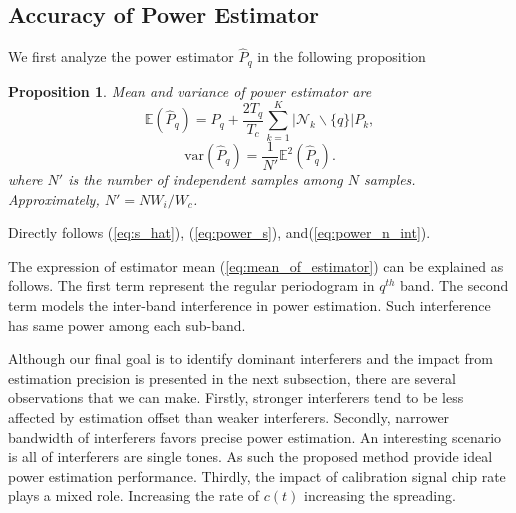 \documentclass{IEEEtran}
\newtheorem{proposition}{Proposition}
\begin{document}

%
%
\subsection{Accuracy of Power Estimator}
\label{sec:problem_formulation}
We first analyze the power estimator $\hat{P}_{q}$ in the following proposition

\begin{proposition}
\label{proposition:estimation_formulation}
Mean and variance of power estimator are
\begin{equation}
\mathbb{E}\left(\hat{P}_{q}\right) = P_{q}+\frac{2T_q}{T_c}\sum\limits_{k=1}^{K}\left|\mathcal{N}_k\backslash \{q\}\right|P_{k},
\label{eq:mean_of_estimator}
\end{equation}
\begin{equation}
\text{var}\left(\hat{P}_{q}\right) = \frac{1}{N'}\mathbb{E}^2\left(\hat{P}_{q}\right).
\label{eq:var_of_estimator}
\end{equation}
where $N'$ is the number of independent samples among $N$ samples. Approximately, $N' = NW_i/W_c$.
\end{proposition}
\begin{IEEEproof}
Directly follows (\ref{eq:s_hat}), (\ref{eq:power_s}), and(\ref{eq:power_n_int}).
\end{IEEEproof}

The expression of estimator mean (\ref{eq:mean_of_estimator}) can be explained as follows. The first term represent the regular periodogram in $q^{th}$ band. The second term models the inter-band interference in power estimation. Such interference has same power among each sub-band.

Although our final goal is to identify dominant interferers and the impact from estimation precision is presented in the next subsection, there are several observations that we can make. Firstly, stronger interferers tend to be less affected by estimation offset than weaker interferers. Secondly, narrower bandwidth of interferers favors precise power estimation. An interesting scenario is all of interferers are single tones. As such the proposed method provide ideal power estimation performance. Thirdly, the impact of calibration signal chip rate plays a mixed role. Increasing the rate of $c(t)$ increasing the spreading. 
%
%
\end{document}
